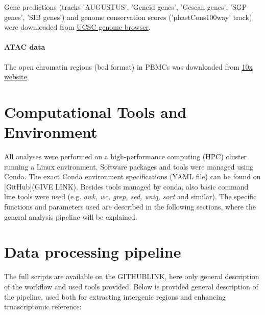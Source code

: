 Gene predictions (tracks 'AUGUSTUS', 'Geneid genes', 'Gescan genes', 'SGP genes', 'SIB genes') and 
genome conservation scores ('phastCons100way' track) were downloaded from \href{https://genome.ucsc.edu/}{UCSC genome browser}.

\paragraph{ATAC data}

The open chromatin regions (bed format) in PBMCs was downloaded from \href{https://www.10xgenomics.com/datasets/10k-human-pbmcs-atac-v2-chromium-controller-2-standard}{10x website}.

\section{Computational Tools and Environment}

All analyses were performed on a high-performance computing (HPC) cluster running a Linux environment.
Software packages and tools were managed using Conda.
The exact Conda environment specifications (YAML file) can be found on [GitHub](GIVE LINK).
Besides tools managed by conda, also basic command line tools were used (e.g. \textit{awk, wc, grep, sed, uniq, sort} and similar).
The specific functions and parameters used are described in the following sections, where the general analysis pipeline will be explained.

\section{Data processing pipeline}

The full scripts are available on the GITHUBLINK, here only general description of the workflow and used tools provided.
Below is provided general description of the pipeline, used both for extracting intergenic regions and enhancing trnascriptomic reference:

